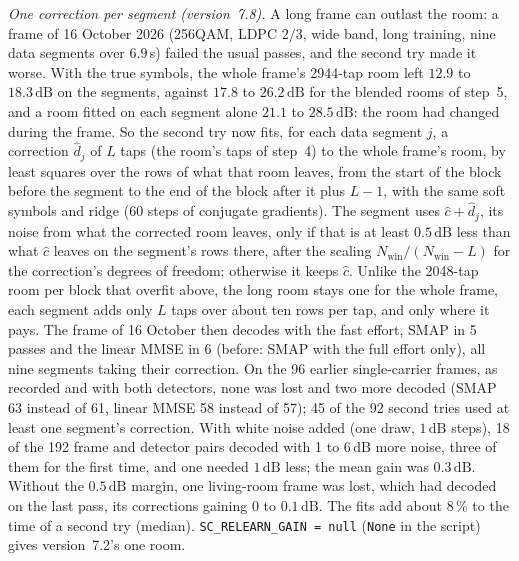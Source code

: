 \documentclass[11pt,a4paper]{article}
\newcommand{\dB}{\,\mathrm{dB}}
\newcommand{\code}[1]{\texttt{#1}}
\theoremstyle{remark}
\begin{document}
\emph{One correction per segment (version~7.8).} A long frame can outlast the room: a frame of 16 October 2026 (256QAM, LDPC $2/3$, wide band, long training, nine data segments over $6.9$\,s) failed the usual passes, and the second try made it worse. With the true symbols, the whole frame's 2944-tap room left $12.9$ to $18.3\dB$ on the segments, against $17.8$ to $26.2\dB$ for the blended rooms of step~5, and a room fitted on each segment alone $21.1$ to $28.5\dB$: the room had changed during the frame. So the second try now fits, for each data segment $j$, a correction $\hat d_j$ of $L$ taps (the room's taps of step~4) to the whole frame's room, by least squares over the rows of what that room leaves, from the start of the block before the segment to the end of the block after it plus $L - 1$, with the same soft symbols and ridge ($60$ steps of conjugate gradients). The segment uses $\hat c + \hat d_j$, its noise from what the corrected room leaves, only if that is at least $0.5\dB$ less than what $\hat c$ leaves on the segment's rows there, after the scaling $N_{\mathrm{win}}/(N_{\mathrm{win}} - L)$ for the correction's degrees of freedom; otherwise it keeps $\hat c$. Unlike the 2048-tap room per block that overfit above, the long room stays one for the whole frame, each segment adds only $L$ taps over about ten rows per tap, and only where it pays. The frame of 16 October then decodes with the fast effort, SMAP in 5 passes and the linear MMSE in 6 (before: SMAP with the full effort only), all nine segments taking their correction. On the 96 earlier single-carrier frames, as recorded and with both detectors, none was lost and two more decoded (SMAP 63 instead of 61, linear MMSE 58 instead of 57); 45 of the 92 second tries used at least one segment's correction. With white noise added (one draw, $1\dB$ steps), 18 of the 192 frame and detector pairs decoded with 1 to $6\dB$ more noise, three of them for the first time, and one needed $1\dB$ less; the mean gain was $0.3\dB$. Without the $0.5\dB$ margin, one living-room frame was lost, which had decoded on the last pass, its corrections gaining $0$ to $0.1\dB$. The fits add about 8\,\% to the time of a second try (median). \code{SC\_RELEARN\_GAIN = null} (\code{None} in the script) gives version~7.2's one room.
\end{document}
